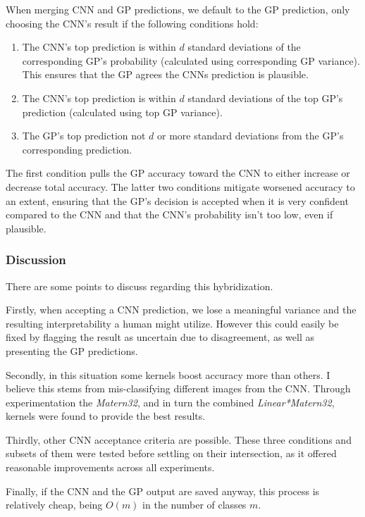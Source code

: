 \documentclass{article}
\begin{document}
When merging CNN and GP predictions, we default to the GP prediction, only choosing the CNN's result if the following conditions hold:

\begin{enumerate}
\item The CNN's top prediction is within $d$ standard deviations of the corresponding GP's probability (calculated using corresponding GP variance). This ensures that the GP agrees the CNNs prediction is plausible. 
\item The CNN's top prediction is within $d$ standard deviations of the top GP's prediction (calculated using top GP variance).
\item The GP's top prediction not $d$ or more standard deviations from the GP's corresponding prediction.
\end{enumerate}

The first condition pulls the GP accuracy toward the CNN to either increase or decrease total accuracy. The latter two conditions mitigate worsened accuracy to an extent, ensuring that the GP's decision is accepted when it is very confident compared to the CNN and that the CNN's probability isn't too low, even if plausible. 

\subsubsection{Discussion}
There are some points to discuss regarding this hybridization.

Firstly, when accepting a CNN prediction, we lose a meaningful variance and the resulting interpretability a human might utilize. However this could easily be fixed by flagging the result as uncertain due to disagreement, as well as presenting the GP predictions. 

Secondly, in this situation some kernels boost accuracy more than others. I believe this stems from mis-classifying different images from the CNN. Through experimentation the \textit{Matern32}, and in turn the combined \textit{Linear*Matern32}, kernels were found to provide the best results.  %

Thirdly, other CNN acceptance criteria are possible. These three conditions and subsets of them were tested before settling on their intersection, as it offered reasonable improvements across all experiments.

Finally, if the CNN and the GP output are saved anyway, this process is relatively cheap, being $O(m)$ in the number of classes $m$.
\end{document}
